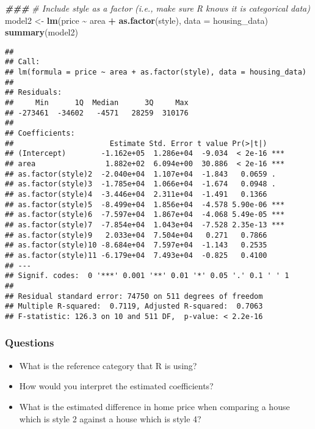 \documentclass[
]{article}
\newenvironment{Shaded}{\begin{snugshade}}{\end{snugshade}}
\newcommand{\AttributeTok}[1]{\textcolor[rgb]{0.13,0.29,0.53}{#1}}
\newcommand{\CommentTok}[1]{\textcolor[rgb]{0.56,0.35,0.01}{\textit{#1}}}
\newcommand{\DocumentationTok}[1]{\textcolor[rgb]{0.56,0.35,0.01}{\textbf{\textit{#1}}}}
\newcommand{\FunctionTok}[1]{\textcolor[rgb]{0.13,0.29,0.53}{\textbf{#1}}}
\newcommand{\NormalTok}[1]{#1}
\newcommand{\OtherTok}[1]{\textcolor[rgb]{0.56,0.35,0.01}{#1}}
\newcommand{\SpecialCharTok}[1]{\textcolor[rgb]{0.81,0.36,0.00}{\textbf{#1}}}
\providecommand{\tightlist}{%
  \setlength{\itemsep}{0pt}\setlength{\parskip}{0pt}}
\begin{document}
\begin{Shaded}
\begin{Highlighting}[]
\DocumentationTok{\#\#\#}
\CommentTok{\# Include style as a factor (i.e., make sure R knows it is categorical data)}
\NormalTok{model2 }\OtherTok{\textless{}{-}} \FunctionTok{lm}\NormalTok{(price }\SpecialCharTok{\textasciitilde{}}\NormalTok{ area }\SpecialCharTok{+} \FunctionTok{as.factor}\NormalTok{(style), }\AttributeTok{data =}\NormalTok{ housing\_data)}
\FunctionTok{summary}\NormalTok{(model2)}
\end{Highlighting}
\end{Shaded}

\begin{verbatim}
## 
## Call:
## lm(formula = price ~ area + as.factor(style), data = housing_data)
## 
## Residuals:
##     Min      1Q  Median      3Q     Max 
## -273461  -34602   -4571   28259  310176 
## 
## Coefficients:
##                      Estimate Std. Error t value Pr(>|t|)    
## (Intercept)        -1.162e+05  1.286e+04  -9.034  < 2e-16 ***
## area                1.882e+02  6.094e+00  30.886  < 2e-16 ***
## as.factor(style)2  -2.040e+04  1.107e+04  -1.843   0.0659 .  
## as.factor(style)3  -1.785e+04  1.066e+04  -1.674   0.0948 .  
## as.factor(style)4  -3.446e+04  2.311e+04  -1.491   0.1366    
## as.factor(style)5  -8.499e+04  1.856e+04  -4.578 5.90e-06 ***
## as.factor(style)6  -7.597e+04  1.867e+04  -4.068 5.49e-05 ***
## as.factor(style)7  -7.854e+04  1.043e+04  -7.528 2.35e-13 ***
## as.factor(style)9   2.033e+04  7.504e+04   0.271   0.7866    
## as.factor(style)10 -8.684e+04  7.597e+04  -1.143   0.2535    
## as.factor(style)11 -6.179e+04  7.493e+04  -0.825   0.4100    
## ---
## Signif. codes:  0 '***' 0.001 '**' 0.01 '*' 0.05 '.' 0.1 ' ' 1
## 
## Residual standard error: 74750 on 511 degrees of freedom
## Multiple R-squared:  0.7119, Adjusted R-squared:  0.7063 
## F-statistic: 126.3 on 10 and 511 DF,  p-value: < 2.2e-16
\end{verbatim}

\subsubsection{Questions}\label{questions-5}

\begin{itemize}
\tightlist
\item
  What is the reference category that R is using?
\item
  How would you interpret the estimated coefficients?
\item
  What is the estimated difference in home price when comparing a house
  which is style 2 against a house which is style 4?
\end{itemize}
\end{document}

